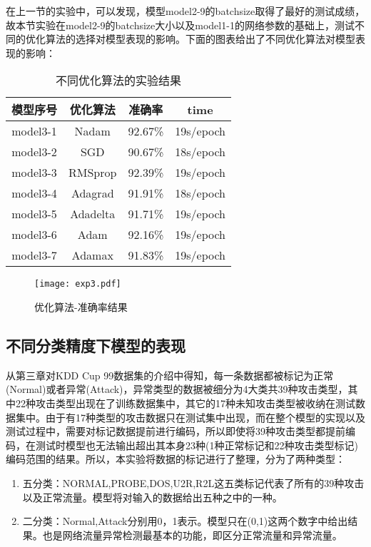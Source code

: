在上一节的实验中，可以发现，模型model2-9的batchsize取得了最好的测试成绩，故本节实验在model2-9的batchsize大小以及model1-1的网络参数的基础上，测试不同的优化算法的选择对模型表现的影响。下面的图表给出了不同优化算法对模型表现的影响：
\begin{table}[htbp]
	\centering
	\caption{不同优化算法的实验结果}
	\begin{tabular}{c|c|c|c}
		\toprule
		模型序号 & 优化算法 & 准确率  & time      \\
		\midrule
		model3-1 & Nadam    & 92.67\% & 19s/epoch \\
		\midrule
		model3-2 & SGD      & 90.67\% & 18s/epoch \\
		\midrule
		model3-3 & RMSprop  & 92.39\% & 19s/epoch \\
		\midrule
		model3-4 & Adagrad  & 91.91\% & 18s/epoch \\
		\midrule
		model3-5 & Adadelta & 91.71\% & 19s/epoch \\
		\midrule
		model3-6 & Adam     & 92.16\% & 19s/epoch \\
		\midrule
		model3-7 & Adamax   & 91.83\% & 19s/epoch \\
		\bottomrule
	\end{tabular}%
	\label{tab:exp3-1}%
\end{table}%

\begin{figure}[H]
    \centering
    \texttt{[image: exp3.pdf]}
    \caption{优化算法-准确率结果}
    \label{fig:exp3-2}
\end{figure}


\subsection{不同分类精度下模型的表现}

从第三章对KDD Cup 99数据集的介绍中得知，每一条数据都被标记为正常(Normal)或者异常(Attack)，异常类型的数据被细分为4大类共39种攻击类型，其中22种攻击类型出现在了训练数据集中，其它的17种未知攻击类型被收纳在测试数据集中。由于有17种类型的攻击数据只在测试集中出现，而在整个模型的实现以及测试过程中，需要对标记数据提前进行编码，所以即使将39种攻击类型都提前编码，在测试时模型也无法输出超出其本身23种(1种正常标记和22种攻击类型标记)编码范围的结果。所以，本实验将数据的标记进行了整理，分为了两种类型：
\begin{enumerate}
    \item 五分类：NORMAL,PROBE,DOS,U2R,R2L这五类标记代表了所有的39种攻击以及正常流量。模型将对输入的数据给出五种之中的一种。
    \item 二分类：Normal,Attack分别用0，1表示。模型只在(0,1)这两个数字中给出结果。也是网络流量异常检测最基本的功能，即区分正常流量和异常流量。
\end{enumerate}

